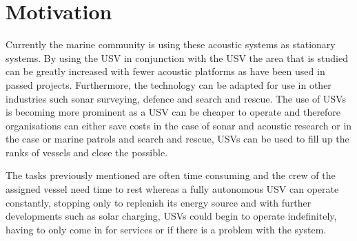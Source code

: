 \section{Motivation}
Currently the marine community is using these acoustic systems as stationary systems. By using the USV in conjunction with the USV the area that is studied can be greatly increased with fewer acoustic platforms as have been used in passed projects. Furthermore, the technology can be adapted for use in other industries such sonar surveying, defence and search and rescue. The use of USVs is becoming more prominent as a USV can be cheaper to operate and therefore organisations can either save costs in the case of sonar and acoustic research or in the case or marine patrols and search and rescue, USVs can be used to fill up the ranks of vessels and close the possible.\par
\vspace{0.6cm}
The tasks previously mentioned are often time consuming and the crew of the assigned vessel need time to rest whereas a fully autonomous USV can operate constantly, stopping only to replenish its energy source and with further developments such as solar charging, USVs could begin to operate indefinitely, having to only come in for services or if there is a problem with the system.
